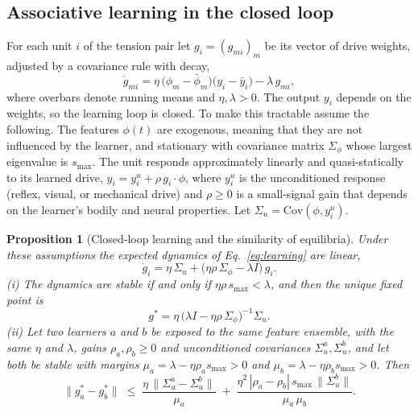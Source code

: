 \documentclass[11pt]{article}
\theoremstyle{plain}
\newtheorem{proposition}{Proposition}
\theoremstyle{definition}
\begin{document}
\subsection{Associative learning in the closed loop}

For each unit $i$ of the tension pair let $g_i=(g_{mi})_m$ be its vector of drive weights, adjusted by a covariance rule with decay,
\begin{equation}
\dot g_{mi} = \eta\,\big(\phi_m-\bar\phi_m\big)\big(y_i-\bar y_i\big) - \lambda\,g_{mi},
\label{eq:learning}
\end{equation}
where overbars denote running means and $\eta,\lambda>0$. The output $y_i$ depends on the weights, so the learning loop is closed. To make this tractable assume the following. The features $\phi(t)$ are exogenous, meaning that they are not influenced by the learner, and stationary with covariance matrix $\Sigma_\phi$ whose largest eigenvalue is $s_{\max}$. The unit responds approximately linearly and quasi-statically to its learned drive, $y_i=y_i^{u}+\rho\,g_i\!\cdot\!\phi$, where $y_i^{u}$ is the unconditioned response (reflex, visual, or mechanical drive) and $\rho\ge 0$ is a small-signal gain that depends on the learner's bodily and neural properties. Let $\Sigma_u=\mathrm{Cov}(\phi,y_i^{u})$.

\begin{proposition}[Closed-loop learning and the similarity of equilibria]
\label{prop:learning}
Under these assumptions the expected dynamics of Eq.~\eqref{eq:learning} are linear,
\[
\dot g_i = \eta\,\Sigma_u + \big(\eta\rho\,\Sigma_\phi - \lambda I\big)\,g_i .
\]
(i) The dynamics are stable if and only if $\eta\rho\,s_{\max}<\lambda$, and then the unique fixed point is
\[
g^{\ast} = \eta\,\big(\lambda I-\eta\rho\,\Sigma_\phi\big)^{-1}\Sigma_u .
\]
(ii) Let two learners $a$ and $b$ be exposed to the same feature ensemble, with the same $\eta$ and $\lambda$, gains $\rho_a,\rho_b\ge 0$ and unconditioned covariances $\Sigma_u^{a},\Sigma_u^{b}$, and let both be stable with margins $\mu_a=\lambda-\eta\rho_a s_{\max}>0$ and $\mu_b=\lambda-\eta\rho_b s_{\max}>0$. Then
\[
\big\|g_a^{\ast}-g_b^{\ast}\big\| \;\le\; \frac{\eta\,\big\|\Sigma_u^{a}-\Sigma_u^{b}\big\|}{\mu_a} \;+\; \frac{\eta^{2}\,|\rho_a-\rho_b|\,s_{\max}\,\big\|\Sigma_u^{b}\big\|}{\mu_a\,\mu_b}.
\]
\end{proposition}
\end{document}
